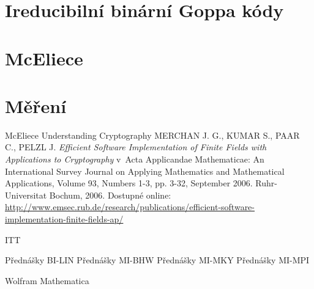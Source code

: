\documentclass[thesis=M,czech,hidelinks]{FITthesis}[2012/06/26]
\newcommand{\0}{{\textcolor[gray]{0.100}{0}}}
\begin{document}
\section{Ireducibilní binární Goppa kódy}

\section{McEliece}

\section{Měření}




\begin{conclusion}
\end{conclusion}





%
%
\begin{thebibliography}{99}

     McEliece
     Understanding Cryptography
        \uppercase{Merchan} J. G., \uppercase{Kumar} S., \uppercase{Paar} C.,
        \uppercase{Pelzl} J. \emph{Efficient Software Implementation of Finite
        Fields with Applications to Cryptography} v~Acta Applicandae
        Mathematicae: An International Survey Journal on Applying Mathematics
        and Mathematical Applications, Volume 93, Numbers 1-3, pp.  3-32,
        September 2006.  Ruhr-Universitat Bochum, 2006. Dostupné online:
        \url{http://www.emsec.rub.de/research/publications/efficient-software-implementation-finite-fields-ap/}

     ITT

     Přednášky BI-LIN
     Přednášky MI-BHW
     Přednášky MI-MKY
     Přednášky MI-MPI

     Wolfram Mathematica
\end{thebibliography}

\appendix
\end{document}
